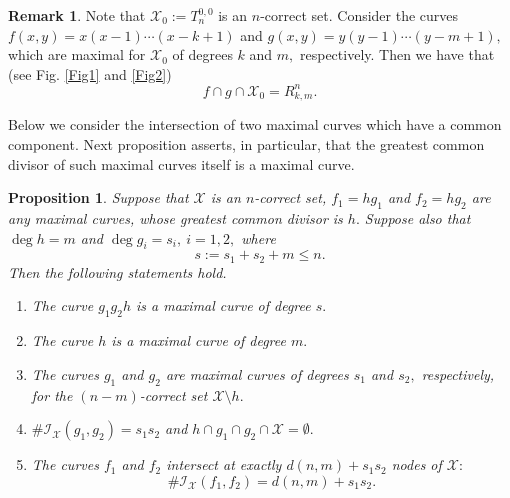 \documentclass[a4paper,12pt]{article}
\newtheorem{proposition}[lemma]{Proposition}
\theoremstyle{definition}
\newtheorem{remark}[lemma]{Remark}
\numberwithin{equation}{section}
\numberwithin{figure}{section}
\newcommand{\Iset}{\mathcal{I}}
\newcommand{\Xset}{\mathcal{X}}
\begin{document}
\begin{remark} Note that $\Xset_0:=T^{0,0}_n$ is an $n$-correct set. Consider the curves $f(x,y)=x(x-1)\cdots (x-k+1)$ and $g(x,y)=y(y-1)\cdots (y-m+1),$ which are maximal for 
$\Xset_0$ of degrees $k$ and $m,$ respectively. Then we have that (see Fig. \ref{Fig1} and \ref{Fig2})
$$f \cap g\cap \Xset_0=R_{k,m}^n.$$
\end{remark}


Below we consider the intersection of two maximal curves which have a common component. Next proposition asserts, in particular, that the greatest common divisor of such maximal curves itself is a maximal curve.

\begin{proposition}\label{prop7}
Suppose that $\Xset$ is an $n$-correct set, $f_1=hg_1$ and $f_2=hg_2$ are any 
maximal curves, whose greatest common divisor is $h.$ Suppose also that  $\deg h=m$ and $\deg g_i=s_i,\ i=1,2,$ where 
\begin{equation} \label{skm} s :=s_1+s_2+m\le n.
\end{equation}
Then the following statements hold.
\begin{enumerate}
\item
The curve $g_1g_2h$ is a maximal curve of degree $s.$
\item
The curve $h$ is a maximal curve of degree $m.$
\item
The curves $g_1$ and $g_2$ are maximal curves of degrees $s_1$ and $s_2,$ respectively, for the $(n-m)$-correct set $\Xset\setminus h.$
\item
$\#\Iset_\Xset(g_1,g_2) =s_1 s_2$ and $h\cap g_1\cap g_2\cap \Xset=\emptyset.$
\item
The curves $f_1$ and $f_2$ intersect at exactly $d(n,m)+s_1 s_2$ nodes of $\Xset:$
\begin{equation}\label{k_1k_2}\#\Iset_\Xset(f_1,f_2) =d(n,m)+s_1 s_2.\end{equation}
\end{enumerate}
\end{proposition}
\end{document}
